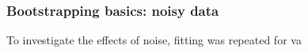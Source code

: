\subsubsection{Bootstrapping basics: noisy data}

To investigate the effects of noise, fitting was repeated for va